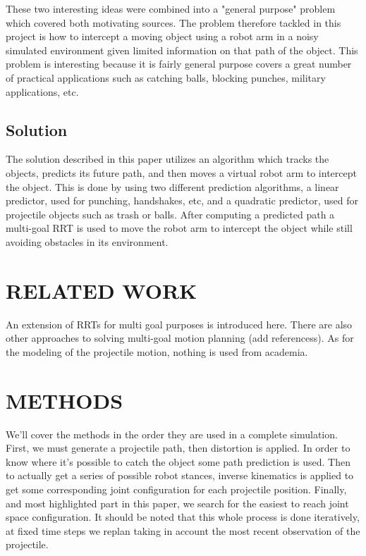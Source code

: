 \documentclass[letterpaper, 10 pt, conference]{ieeeconf}  %
\begin{document}
These two interesting ideas were combined into a "general purpose" problem
which covered both motivating sources. The problem therefore tackled in this
project is how to intercept a moving object using a robot arm in a noisy
simulated environment given limited information on that path of the object.
This problem is interesting because it is fairly general purpose covers a great
number of practical applications such as catching balls, blocking punches,
military applications, etc.

\subsection{Solution}

The solution described in this paper utilizes an algorithm which tracks the
objects, predicts its future path, and then moves a virtual robot arm to
intercept the object. This is done by using two different prediction
algorithms, a linear predictor, used for punching, handshakes, etc, and a
quadratic predictor, used for projectile objects such as trash or balls. After
computing a predicted path a multi-goal RRT is used to move the robot arm to
intercept the object while still avoiding obstacles in its environment.



\section{RELATED WORK}

An extension of RRTs for multi goal purposes is introduced here. There are also
other approaches to solving multi-goal motion planning (add referencess). As
for the modeling of the projectile motion, nothing is used from academia.

\section{METHODS}

We'll cover the methods in the order they are used in a complete simulation.
First, we must generate a projectile path, then distortion is applied. In order
to know where it's possible to catch the object some path prediction is used.
Then to actually get a series of possible robot stances, inverse kinematics is
applied to get some corresponding joint configuration for each projectile
position. Finally, and most highlighted part in this paper, we search for the
easiest to reach joint space configuration. It should be noted that this whole
process is done iteratively, at fixed time steps we replan taking in account
the most recent observation of the projectile.
\end{document}
